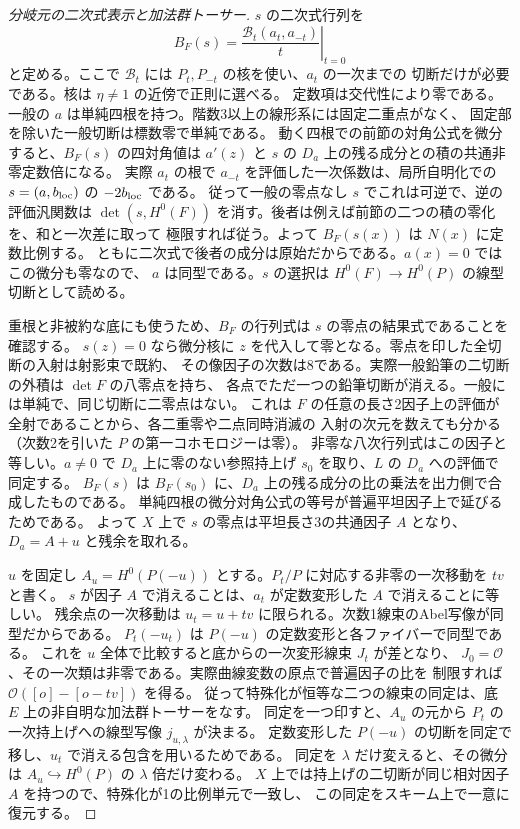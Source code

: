 \begin{proof}[分岐元の二次式表示と加法群トーサー]
$s$ の二次式行列を
\[
 B_F(s)=\left.\frac{\mathcal B_t(a_t,a_{-t})}{t}\right|_{t=0}
\]
と定める。ここで $\mathcal B_t$ には $P_t,P_{-t}$ の核を使い、$a_t$ の一次までの
切断だけが必要である。核は $\eta\ne1$ の近傍で正則に選べる。
定数項は交代性により零である。
一般の $a$ は単純四根を持つ。階数3以上の線形系には固定二重点がなく、
固定部を除いた一般切断は標数零で単純である。
動く四根での前節の対角公式を微分すると、$B_F(s)$ の四対角値は
$a'(z)$ と $s$ の $D_a$ 上の残る成分との積の共通非零定数倍になる。
実際 $a_t$ の根で $a_{-t}$ を評価した一次係数は、局所自明化での
$s=(a,b_{\rm loc})$ の $-2b_{\rm loc}$ である。
従って一般の零点なし $s$ でこれは可逆で、逆の評価汎関数は
$\det(s,H^0(F))$ を消す。後者は例えば前節の二つの積の零化を、和と一次差に取って
極限すれば従う。よって $B_F(s(x))$ は $N(x)$ に定数比例する。
ともに二次式で後者の成分は原始だからである。$a(x)=0$ ではこの微分も零なので、
$a$ は同型である。$s$ の選択は $H^0(F)\to H^0(P)$ の線型切断として読める。

重根と非被約な底にも使うため、$B_F$ の行列式は $s$ の零点の結果式であることを確認する。
$s(z)=0$ なら微分核に $z$ を代入して零となる。零点を印した全切断の入射は射影束で既約、
その像因子の次数は8である。実際一般鉛筆の二切断の外積は $\det F$ の八零点を持ち、
各点でただ一つの鉛筆切断が消える。一般には単純で、同じ切断に二零点はない。
これは $F$ の任意の長さ2因子上の評価が全射であることから、各二重零や二点同時消滅の
入射の次元を数えても分かる（次数2を引いた $P$ の第一コホモロジーは零）。
非零な八次行列式はこの因子と等しい。$a\ne0$ で $D_a$ 上に零のない参照持上げ
$s_0$ を取り、$L$ の $D_a$ への評価で同定する。
$B_F(s)$ は $B_F(s_0)$ に、$D_a$ 上の残る成分の比の乗法を出力側で合成したものである。
単純四根の微分対角公式の等号が普遍平坦因子上で延びるためである。
よって $X$ 上で $s$ の零点は平坦長さ3の共通因子 $A$ となり、$D_a=A+u$ と残余を取れる。

$u$ を固定し $A_u=H^0(P(-u))$ とする。$P_t/P$ に対応する非零の一次移動を $t v$ と書く。
$s$ が因子 $A$ で消えることは、$a_t$ が定数変形した $A$ で消えることに等しい。
残余点の一次移動は $u_t=u+tv$ に限られる。次数1線束のAbel写像が同型だからである。
$P_t(-u_t)$ は $P(-u)$ の定数変形と各ファイバーで同型である。
これを $u$ 全体で比較すると底からの一次変形線束 $J_t$ が差となり、
$J_0=\mathcal O$、その一次類は非零である。実際曲線変数の原点で普遍因子の比を
制限すれば $\mathcal O([o]-[o-tv])$ を得る。
従って特殊化が恒等な二つの線束の同定は、底 $E$ 上の非自明な加法群トーサーをなす。
同定を一つ印すと、$A_u$ の元から $P_t$ の一次持上げへの線型写像 $j_{u,\lambda}$ が決まる。
定数変形した $P(-u)$ の切断を同定で移し、$u_t$ で消える包含を用いるためである。
同定を $\lambda$ だけ変えると、その微分は $A_u\hookrightarrow H^0(P)$ の $\lambda$ 倍だけ変わる。
$X$ 上では持上げの二切断が同じ相対因子 $A$ を持つので、特殊化が1の比例単元で一致し、
この同定をスキーム上で一意に復元する。


\end{proof}
